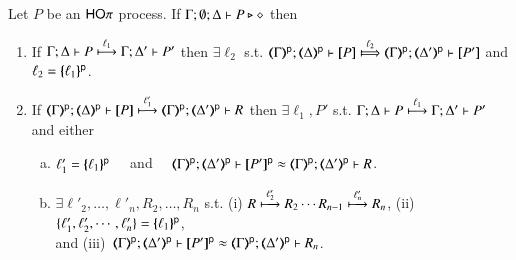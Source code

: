 \begin{proposition}\label{p:ocpotomo}
Let $P$ be an  $\HOp$ process.
If $\Gamma; \emptyset; \Delta \proves P \hastype \Proc$ then
		\begin{enumerate}[1.]
			\item	 
			   If  $\stytra{\Gamma}{\ell_1}{\Delta}{P}{\Delta'}{P'}$
			   then  $\exists \ell_2$ s.t. 
			    $\wtytra{\mapt{\Gamma}^{\mathsf{p}}}{\ell_2}{\mapt{\Delta}^{\mathsf{p}}}{\map{P}}{\mapt{\Delta'}^{\mathsf{p}}}{\map{P'}}$
			    and $\ell_2 = \mapa{\ell_1}^{\mathsf{p}}$.
			    
			\item   
			If  $\stytra{\mapt{\Gamma}^{\mathsf{p}}}{\ell'_1}{\mapt{\Delta}^{\mathsf{p}}}{\map{P}}{\mapt{\Delta'}^{\mathsf{p}}}{R}$
			   then 
			   $\exists \ell_1, P'$ s.t.  
			   $\stytra{\Gamma}{\ell_1}{\Delta}{P}{\Delta'}{P'}$
			   and 
			   either
			   		\begin{enumerate}[a)]
					\item   
			      $\ell'_1 = \mapa{\ell_1}^{\mathsf{p}}$ ~~and~~ 
			    $\wbb{\mapt{\Gamma}^{\mathsf{p}}}{\ell}{\mapt{\Delta'}^{\mathsf{p}}}{\map{P'}^{\mathsf{p}}}{\mapt{\Delta'}^{\mathsf{p}}}{R}$.
			   		
					\item $\exists \ell'_2, \ldots, \ell'_n, R_2, \ldots, R_n$ s.t. 
					(i) $R \hby{\ell'_2} R_2   \cdots  R_{n-1} \hby{\ell'_n} R_n$,  
					(ii)~$\{\ell'_1, \ell'_2, \cdots, \ell'_n\} = \mapa{\ell_1}^{\mathsf{p}}$, \\ and 
					(iii)~$\wbb{\mapt{\Gamma}^{\mathsf{p}}}{\ell}{\mapt{\Delta'}^{\mathsf{p}}}{\map{P'}^{\mathsf{p}}}{\mapt{\Delta'}^{\mathsf{p}}}{R_n}$.
					\end{enumerate}




			    \end{enumerate}
\end{proposition}

